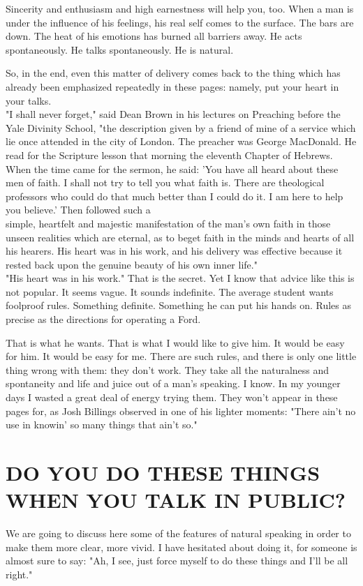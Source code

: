 \documentclass[10pt]{article}
\begin{document}
Sincerity and enthusiasm and high earnestness will help you, too. When a man is under the influence of his feelings, his real self comes to the surface. The bars are down. The heat of his emotions has burned all barriers away. He acts spontaneously. He talks spontaneously. He is natural.

So, in the end, even this matter of delivery comes back to the thing which has already been emphasized repeatedly in these pages: namely, put your heart in your talks.\\
"I shall never forget," said Dean Brown in his lectures on Preaching before the Yale Divinity School, "the description given by a friend of mine of a service which lie once attended in the city of London. The preacher was George MacDonald. He read for the Scripture lesson that morning the eleventh Chapter of Hebrews. When the time came for the sermon, he said: 'You have all heard about these men of faith. I shall not try to tell you what faith is. There are theological professors who could do that much better than I could do it. I am here to help you believe.' Then followed such a\\
simple, heartfelt and majestic manifestation of the man's own faith in those unseen realities which are eternal, as to beget faith in the minds and hearts of all his hearers. His heart was in his work, and his delivery was effective because it rested back upon the genuine beauty of his own inner life."\\
"His heart was in his work." That is the secret. Yet I know that advice like this is not popular. It seems vague. It sounds indefinite. The average student wants foolproof rules. Something definite. Something he can put his hands on. Rules as precise as the directions for operating a Ford.

That is what he wants. That is what I would like to give him. It would be easy for him. It would be easy for me. There are such rules, and there is only one little thing wrong with them: they don't work. They take all the naturalness and spontaneity and life and juice out of a man's speaking. I know. In my younger days I wasted a great deal of energy trying them. They won't appear in these pages for, as Josh Billings observed in one of his lighter moments: "There ain't no use in knowin' so many things that ain't so."

\section*{DO YOU DO THESE THINGS WHEN YOU TALK IN PUBLIC?}
We are going to discuss here some of the features of natural speaking in order to make them more clear, more vivid. I have hesitated about doing it, for someone is almost sure to say: "Ah, I see, just force myself to do these things and I'll be all right."
\end{document}
